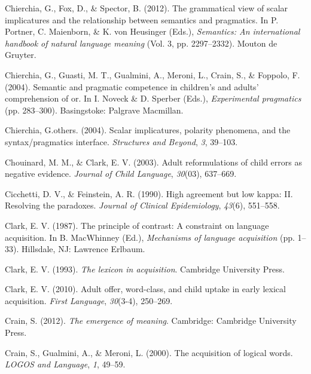 \documentclass[
  ,man,floatsintext]{apa6}
\newlength{\cslhangindent}
\newlength{\cslentryspacingunit} %
\newenvironment{CSLReferences}[2] %
 {%
  \setlength{\parindent}{0pt}
  \ifodd #1
  \let\oldpar\par
  \def\par{\hangindent=\cslhangindent\oldpar}
  \fi
  \setlength{\parskip}{#2\cslentryspacingunit}
 }%
 {}
\begin{document}
\begin{CSLReferences}{1}{0}
\leavevmode{}%
Chierchia, G., Fox, D., \& Spector, B. (2012). The grammatical view of scalar implicatures and the relationship between semantics and pragmatics. In P. Portner, C. Maienborn, \& K. von Heusinger (Eds.), \emph{Semantics: An international handbook of natural language meaning} (Vol. 3, pp. 2297--2332). Mouton de Gruyter.

\leavevmode{}%
Chierchia, G., Guasti, M. T., Gualmini, A., Meroni, L., Crain, S., \& Foppolo, F. (2004). Semantic and pragmatic competence in children's and adults' comprehension of or. In I. Noveck \& D. Sperber (Eds.), \emph{Experimental pragmatics} (pp. 283--300). Basingstoke: Palgrave Macmillan.

\leavevmode{}%
Chierchia, G.others. (2004). Scalar implicatures, polarity phenomena, and the syntax/pragmatics interface. \emph{Structures and Beyond}, \emph{3}, 39--103.

\leavevmode{}%
Chouinard, M. M., \& Clark, E. V. (2003). Adult reformulations of child errors as negative evidence. \emph{Journal of Child Language}, \emph{30}(03), 637--669.

\leavevmode{}%
Cicchetti, D. V., \& Feinstein, A. R. (1990). High agreement but low kappa: II. Resolving the paradoxes. \emph{Journal of Clinical Epidemiology}, \emph{43}(6), 551--558.

\leavevmode{}%
Clark, E. V. (1987). The principle of contrast: A constraint on language acquisition. In B. MacWhinney (Ed.), \emph{Mechanisms of language acquisition} (pp. 1--33). Hillsdale, NJ: Lawrence Erlbaum.

\leavevmode{}%
Clark, E. V. (1993). \emph{The lexicon in acquisition}. Cambridge University Press.

\leavevmode{}%
Clark, E. V. (2010). Adult offer, word-class, and child uptake in early lexical acquisition. \emph{First Language}, \emph{30}(3-4), 250--269.

\leavevmode{}%
Crain, S. (2012). \emph{The emergence of meaning}. Cambridge: Cambridge University Press.

\leavevmode{}%
Crain, S., Gualmini, A., \& Meroni, L. (2000). The acquisition of logical words. \emph{LOGOS and Language}, \emph{1}, 49--59.


\end{CSLReferences}
\end{document}

